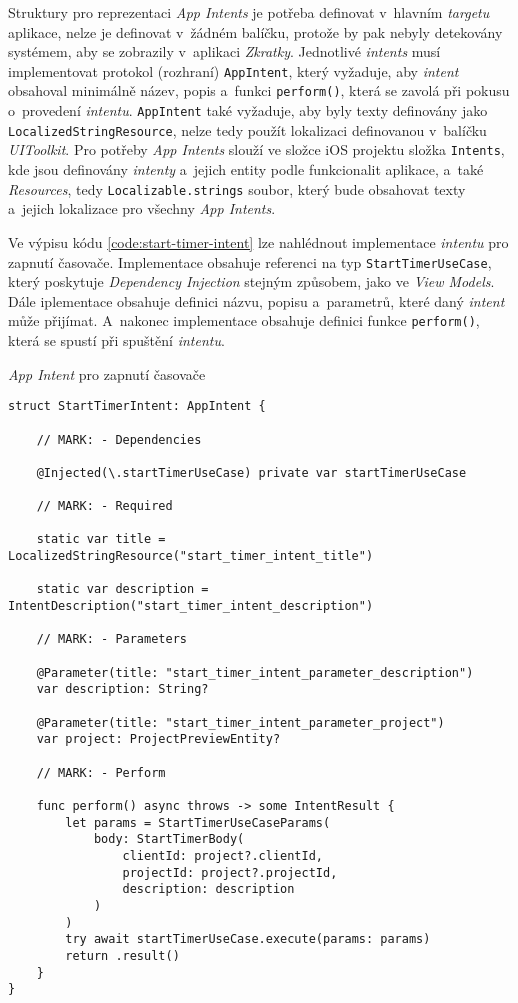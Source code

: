 Struktury pro reprezentaci \emph{App Intents} je potřeba definovat v~hlavním \emph{targetu} aplikace, nelze je definovat v~žádném balíčku, protože by pak nebyly detekovány systémem, aby se zobrazily v~aplikaci \emph{Zkratky}. Jednotlivé \emph{intents} musí implementovat protokol (rozhraní) \texttt{AppIntent}, který vyžaduje, aby \emph{intent} obsahoval minimálně název, popis a~funkci \texttt{perform()}, která se zavolá při pokusu o~provedení \emph{intentu}. \texttt{AppIntent} také vyžaduje, aby byly texty definovány jako \texttt{LocalizedStringResource}, nelze tedy použít lokalizaci definovanou v~balíčku \emph{UIToolkit}. Pro potřeby \emph{App Intents} slouží ve složce iOS projektu složka \texttt{Intents}, kde jsou definovány \emph{intenty} a~jejich entity podle funkcionalit aplikace, a~také \emph{Resources}, tedy \texttt{Localizable.strings} soubor, který bude obsahovat texty a~jejich lokalizace pro všechny \emph{App Intents}.

Ve výpisu kódu \ref{code:start-timer-intent} lze nahlédnout implementace \emph{intentu} pro zapnutí časovače. Implementace obsahuje referenci na typ \texttt{StartTimerUseCase}, který poskytuje \emph{Dependency Injection} stejným způsobem, jako ve \emph{View Models}. Dále iplementace obsahuje definici názvu, popisu a~parametrů, které daný \emph{intent} může přijímat. A~nakonec implementace obsahuje definici funkce \texttt{perform()}, která se spustí při spuštění \emph{intentu}.

\begin{listing}
\caption{\emph{App Intent} pro zapnutí časovače}\label{code:start-timer-intent}
\begin{verbatim}
struct StartTimerIntent: AppIntent {
    
    // MARK: - Dependencies
    
    @Injected(\.startTimerUseCase) private var startTimerUseCase
    
    // MARK: - Required
    
    static var title = LocalizedStringResource("start_timer_intent_title")
    
    static var description = IntentDescription("start_timer_intent_description")
    
    // MARK: - Parameters
    
    @Parameter(title: "start_timer_intent_parameter_description")
    var description: String?
    
    @Parameter(title: "start_timer_intent_parameter_project")
    var project: ProjectPreviewEntity?
    
    // MARK: - Perform
    
    func perform() async throws -> some IntentResult {
        let params = StartTimerUseCaseParams(
            body: StartTimerBody(
                clientId: project?.clientId,
                projectId: project?.projectId,
                description: description
            )
        )
        try await startTimerUseCase.execute(params: params)
        return .result()
    }
}       
\end{verbatim}
\end{listing}

